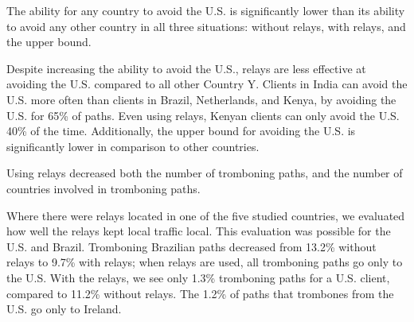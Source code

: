 \begin{finding}
The ability for any country to avoid the U.S. is significantly lower than its ability to avoid any other country in all three situations: without relays, with relays, and the upper bound. 
\end{finding}
\noindent
Despite increasing the ability to avoid the U.S., relays are less
effective at avoiding the U.S. compared to all other Country Y.
Clients in India can avoid the U.S. more often than clients in Brazil,
Netherlands, and Kenya, by avoiding the U.S. for 65\% of paths.  Even
using relays, Kenyan clients can only avoid the U.S. 40\% of the time.  Additionally, the upper bound for avoiding the U.S. is significantly lower in comparison to other countries.  

\begin{finding}
Using relays decreased both the number of tromboning paths, and the
number of countries involved in tromboning paths.
\end{finding}
\noindent
Where there were relays located in one of the five
studied countries, we evaluated how well the relays kept local
traffic local.  This evaluation was possible for the U.S. and Brazil.
Tromboning Brazilian paths decreased from 13.2\% without relays to
9.7\% with relays; when relays are used, all tromboning paths go only
to the U.S.  With the relays, we see only 1.3\% tromboning paths for a
U.S. client, compared to 11.2\% without relays.  The 1.2\% of
paths that trombones from the U.S. go only to Ireland.


